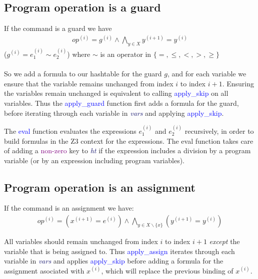 \documentclass[letterpaper,12pt]{article}
\begin{document}
\subsection{Program operation is a guard}\label{guard}
If the command is a guard we have
\begin{align*}
op^{(i)} = g^{(i)} \wedge \bigwedge_{y \in X}y^{(i+1)} = y^{(i)}
\end{align*}
($ g^{(i)} = e_1^{(i)} \sim e_2^{(i)}$) where  $\sim$ is an operator in $ \{ = ,\leq, < , >, \geq \}$  

\paragraph{}
So we add a formula to our hashtable for the guard $g$, and for each variable we ensure that the variable remains unchanged from index $i$ to index $i+1$. 
Ensuring the variables remain unchanged is equivalent to calling \textcolor{blue}{apply\_skip} on all variables.
Thus the \textcolor{blue}{apply\_guard} function first adds a formula for the guard, before iterating through each variable in \textit{\textcolor{MidnightBlue}{vars}}  and applying \textcolor{blue}{apply\_skip}.

The \textcolor{blue}{eval} function evaluates the expressions $e_1^{(i)}$ and $e_2^{(i)}$ recursively, in order to build formulas in the Z3 context for the expressions. The eval function takes care of adding a \textcolor{purple}{non-zero} key to \textit{\textcolor{MidnightBlue}{ht}} if the expression includes a division by a program variable (or by an expression including program variables).

\subsection{Program operation is an assignment}\label{assign}

If the command is an assignment we have:
\begin{align*}
op^{(i)} = (x^{(i+1)} = e^{(i)}) \wedge \bigwedge_{y \in X\backslash \{x\} }(y^{(i+1)} = y^{(i)})
\end{align*}

All variables should remain unchanged from index $i$ to index $i+1$ \textit{except} the variable that is being assigned to. Thus \textcolor{blue}{apply\_assign} iterates through each variable in \textit{\textcolor{MidnightBlue}{vars}} and applies \textcolor{blue}{apply\_skip} before adding a formula for the assignment asociated with $x^{(i)}$, which will replace the previous binding of $x^{(i)}$.
\end{document}
